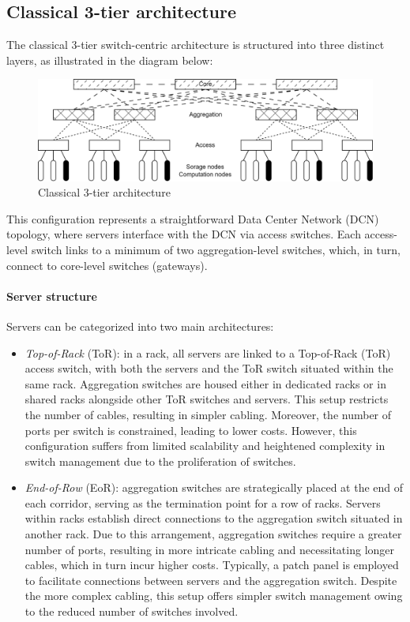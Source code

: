 \subsection{Classical 3-tier architecture}
The classical 3-tier switch-centric architecture is structured into three distinct layers, as illustrated in the diagram below:
\begin{figure}[H]
    \centering
    \includegraphics[width=0.75\linewidth]{images/sca.png}
    \caption{Classical 3-tier architecture} 
\end{figure}
This configuration represents a straightforward Data Center Network (DCN) topology, where servers interface with the DCN via access switches.
Each access-level switch links to a minimum of two aggregation-level switches, which, in turn, connect to core-level switches (gateways).

\paragraph*{Server structure}
Servers can be categorized into two main architectures:
\begin{itemize}
    \item \textit{Top-of-Rack} (ToR): in a rack, all servers are linked to a Top-of-Rack (ToR) access switch, with both the servers and the ToR switch situated within the same rack.
        Aggregation switches are housed either in dedicated racks or in shared racks alongside other ToR switches and servers. 
        This setup restricts the number of cables, resulting in simpler cabling. 
        Moreover, the number of ports per switch is constrained, leading to lower costs. 
        However, this configuration suffers from limited scalability and heightened complexity in switch management due to the proliferation of switches.
    \item \textit{End-of-Row} (EoR): aggregation switches are strategically placed at the end of each corridor, serving as the termination point for a row of racks. 
        Servers within racks establish direct connections to the aggregation switch situated in another rack. 
        Due to this arrangement, aggregation switches require a greater number of ports, resulting in more intricate cabling and necessitating longer cables, which in turn incur higher costs. 
        Typically, a patch panel is employed to facilitate connections between servers and the aggregation switch. 
        Despite the more complex cabling, this setup offers simpler switch management owing to the reduced number of switches involved.
\end{itemize}

